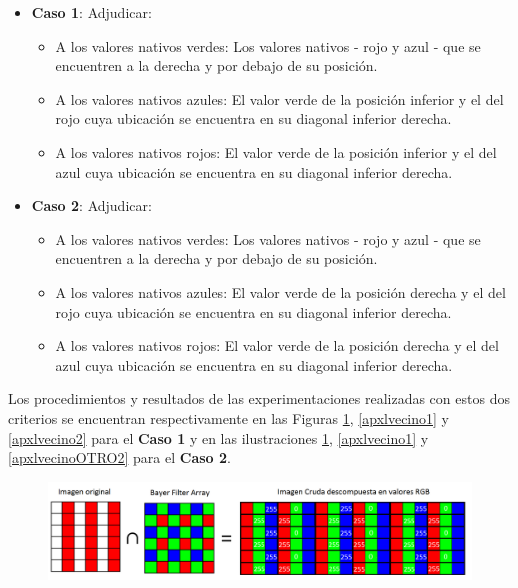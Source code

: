 \documentclass[a4paper]{article}
\begin{document}
\begin{itemize}
\item \textbf{Caso 1}: 
    Adjudicar:
\begin{itemize}
\item   A los valores nativos verdes: Los valores nativos - rojo y azul - que se encuentren a la derecha y por debajo de su posición.
\item   A los valores nativos azules: El valor verde de la posición inferior y el del rojo  cuya ubicación se encuentra en su diagonal inferior derecha.
\item   A los valores nativos rojos: El valor verde de la posición inferior y el del azul cuya ubicación se encuentra en su diagonal inferior derecha.  
\end{itemize}

\item \textbf{Caso 2}: 
    Adjudicar:
\begin{itemize}
\item   A los valores nativos verdes: Los valores nativos - rojo y azul - que se encuentren a la derecha y por debajo de su posición.
\item   A los valores nativos azules: El valor verde de la posición derecha y el del rojo cuya ubicación se encuentra en su diagonal inferior derecha.
\item   A los valores nativos rojos: El valor verde de la posición derecha y el del azul  cuya ubicación se encuentra en su diagonal inferior derecha.
\end{itemize}

    
\end{itemize}

Los procedimientos y resultados de las experimentaciones realizadas con estos dos criterios se encuentran respectivamente en las Figuras \ref{apxlvecino0}, \ref{apxlvecino1} y \ref{apxlvecino2} para el \textbf{Caso 1} y en las ilustraciones \ref{apxlvecino0}, \ref{apxlvecino1} y \ref{apxlvecinoOTRO2} para el \textbf{Caso 2}.

\begin{figure}[h!]
    \caption{}
    \begin{center}
    \includegraphics[scale=0.35]{imagenes/apxlvecino0}
    \label{apxlvecino0}
  \end{center}
\end{figure}
\end{document}
